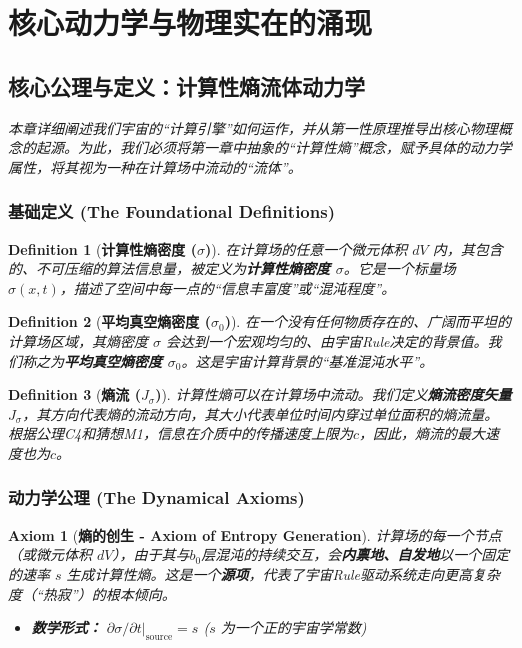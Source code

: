\documentclass[11pt, a4paper]{article}
\newtheorem{axiom}{Axiom}[section]
\newtheorem{definition}{Definition}[section]
\begin{document}
\section{核心动力学与物理实在的涌现}

\subsection{核心公理与定义：计算性熵流体动力学}

\textit{本章详细阐述我们宇宙的“计算引擎”如何运作，并从第一性原理推导出核心物理概念的起源。为此，我们必须将第一章中抽象的“计算性熵”概念，赋予具体的动力学属性，将其视为一种在计算场中流动的“流体”。}

\subsubsection{基础定义 (The Foundational Definitions)}

\begin{definition}[\textbf{计算性熵密度 ($\sigma$)}]
在计算场的任意一个微元体积 $dV$ 内，其包含的、不可压缩的算法信息量，被定义为\textbf{计算性熵密度 $\sigma$}。它是一个标量场 $\sigma(x, t)$，描述了空间中每一点的“信息丰富度”或“混沌程度”。
\end{definition}

\begin{definition}[\textbf{平均真空熵密度 ($\sigma_0$)}]
在一个没有任何物质存在的、广阔而平坦的计算场区域，其熵密度 $\sigma$ 会达到一个宏观均匀的、由宇宙Rule决定的背景值。我们称之为\textbf{平均真空熵密度 $\sigma_0$}。这是宇宙计算背景的“基准混沌水平”。
\end{definition}

\begin{definition}[\textbf{熵流 ($J_\sigma$)}]
计算性熵可以在计算场中流动。我们定义\textbf{熵流密度矢量 $J_\sigma$}，其方向代表熵的流动方向，其大小代表单位时间内穿过单位面积的熵流量。根据公理C4和猜想M1，信息在介质中的传播速度上限为$c$，因此，熵流的最大速度也为$c$。
\end{definition}

\subsubsection{动力学公理 (The Dynamical Axioms)}

\begin{axiom}[\textbf{熵的创生 - Axiom of Entropy Generation}]
计算场的每一个节点（或微元体积 $dV$），由于其与$b_0$层混沌的持续交互，会\textbf{内禀地、自发地}以一个固定的速率 $s$ 生成计算性熵。这是一个\textbf{源项}，代表了宇宙Rule驱动系统走向更高复杂度（“热寂”）的根本倾向。
\begin{itemize}
    \item \textbf{数学形式：} $\partial\sigma/\partial t |_{\text{source}} = s$ ($s$ 为一个正的宇宙学常数)
\end{itemize}
\end{axiom}
\end{document}
